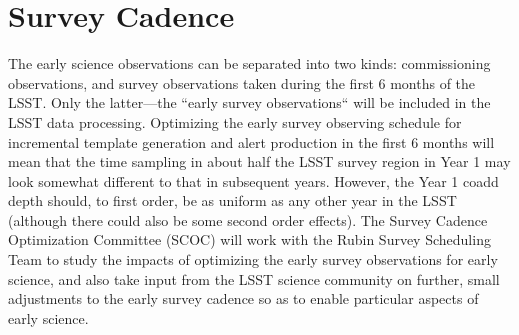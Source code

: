 \section{Survey Cadence}



The early science observations can be separated into two kinds: commissioning observations, and survey observations taken during the first 6 months of the LSST.
Only the latter---the ``early survey observations`` will be included in the LSST data processing.
Optimizing the early survey observing schedule for incremental template generation and alert production in the first 6 months will mean that the time sampling in about half the LSST survey region in Year 1 may look somewhat different to that in subsequent years.
However, the Year 1 coadd depth should, to first order, be as uniform as any other year in the LSST (although there could also be some second order effects).
The Survey Cadence Optimization Committee (SCOC) will work with the Rubin Survey Scheduling Team to study the impacts of optimizing the early survey observations for early science, and also take input from the LSST science community on further, small adjustments to the early survey cadence so as to enable particular aspects of early science.
